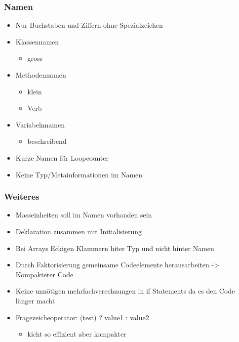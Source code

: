 \documentclass[11pt]{article}
\begin{document}
\subsubsection{Namen}
\label{sec:orgf919dca}
\begin{itemize}
\item Nur Buchstaben und Ziffern ohne Spezialzeichen\\
\item Klassennamen\\
\begin{itemize}
\item gross\\
\end{itemize}
\item Methodennamen\\
\begin{itemize}
\item klein\\
\item Verb\\
\end{itemize}
\item Variabelnnamen\\
\begin{itemize}
\item beschreibend\\
\end{itemize}
\item Kurze Namen für Loopcounter\\
\item Keine Typ/Metainformationen im Namen\\
\end{itemize}

\subsubsection{Weiteres}
\label{sec:orgb6a0a69}
\begin{itemize}
\item Masseinheiten soll im Namen vorhanden sein\\
\item Deklaration zusammen mit Initialisierung\\
\item Bei Arrays Eckigen Klammern hiter Typ und nicht hinter Namen\\
\item Durch Faktorisierung gemeinsame Codeelemente herausarbeiten -> Kompakterer Code\\
\item Keine unnötigen mehrfachverechnungen in if Statements da es den Code länger macht\\
\item Fragezeicheoperator: (test) ? value1 : value2\\
\begin{itemize}
\item kicht so effizient aber kompakter\\
\end{itemize}
\end{itemize}
\end{document}
